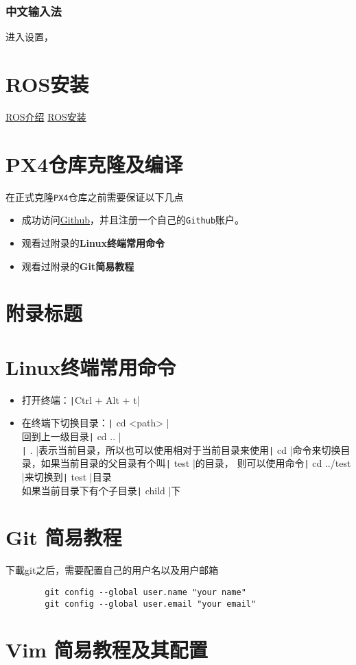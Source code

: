 \documentclass[UTF8]{article}
\begin{document}
\subsubsection{中文输入法}
进入设置，
\section{ROS安装}

\href{URLhttps://wiki.ros.org/ROS/Introduction}{ROS介绍}
\href{https://wiki.ros.org/noetic/Installation/Ubuntu}{ROS安装}

\section{PX4仓库克隆及编译}
在正式克隆\texttt{PX4}仓库之前需要保证以下几点
\begin{itemize}
    \item 成功访问\href{URLhttps://github.com/}{Github}，并且注册一个自己的\texttt{Github}账户。
    \item 观看过附录的\textbf{Linux终端常用命令}
    \item 观看过附录的\textbf{Git简易教程}
\end{itemize}
\begin{appendices}
    \renewcommand{\thesection}{\Alph{section}}
    \section{附录标题}
    \section{Linux终端常用命令}
    \begin{itemize}
        \item 打开终端：\texttt|Ctrl + Alt + t|
        \item 在终端下切换目录：\texttt| cd <path> |\\
              回到上一级目录\texttt| cd .. |\\
              \texttt| . |表示当前目录，所以也可以使用相对于当前目录来使用\texttt| cd |命令来切换目录，如果当前目录的父目录有个叫\texttt| test |的目录，
              则可以使用命令\texttt| cd ../test |来切换到\texttt| test |目录\\
              如果当前目录下有个子目录\texttt| child |下
    \end{itemize}
    \section{Git 简易教程}
    下載git之后，需要配置自己的用户名以及用户邮箱
    \begin{verbatim}
        git config --global user.name "your name"
        git config --global user.email "your email"
    \end{verbatim}

    \section{Vim 简易教程及其配置}
\end{appendices}
\end{document}
